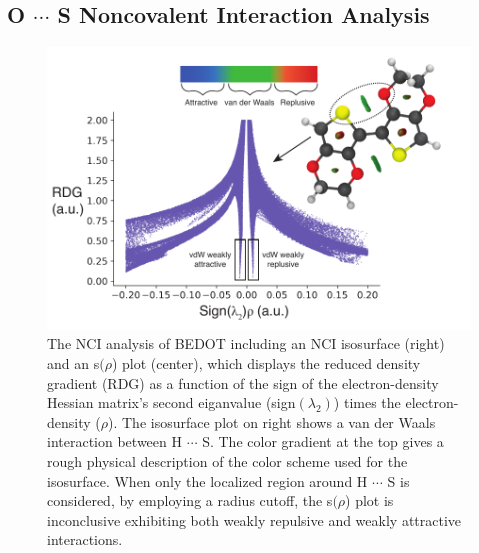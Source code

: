 \subsection{\texorpdfstring{O $\cdots$ S}{OSN} Noncovalent Interaction Analysis}
\begin{figure}[hbt!]
    \centering
    \includegraphics{figures/append_aroma/pedot_nciplot_copy.pdf}
    \caption{The NCI analysis of BEDOT including an NCI isosurface (right) and an s$(\rho$) plot (center), which displays the reduced density gradient (RDG) as a function of the sign of the electron-density Hessian matrix's second eiganvalue (sign$(\lambda_{2})$) times the electron-density ($\rho$). The isosurface plot on right shows a van der Waals interaction between H $\cdots$ S. The color gradient at the top gives a rough physical description of the color scheme used for the isosurface. When only the localized region around H $\cdots$ S is considered, by employing a radius cutoff, the s$(\rho$) plot is inconclusive exhibiting both weakly repulsive and weakly attractive interactions.}
    \label{fig:pedot_nci}
\end{figure}
\clearpage
